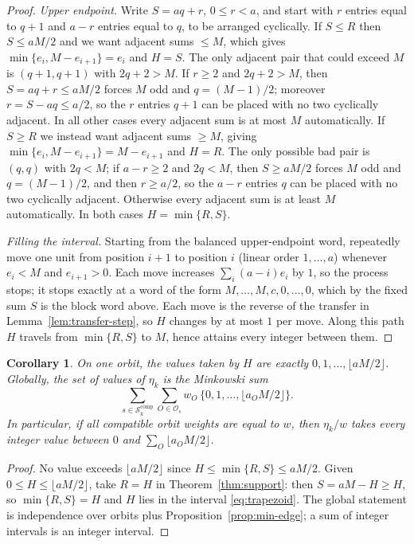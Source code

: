\documentclass[11pt,a4paper]{article}
\newcommand{\Os}{\mathcal O_s}
\numberwithin{equation}{section}
\theoremstyle{plain}
\newtheorem{corollary}[theorem]{Corollary}
\theoremstyle{definition}
\theoremstyle{remark}
\begin{document}
\begin{proof}
\emph{Upper endpoint.}  Write $S=aq+r$, $0\leq r<a$, and start with $r$ entries
equal to $q+1$ and $a-r$ entries equal to $q$, to be arranged cyclically.  If
$S\leq R$ then $S\leq aM/2$ and we want adjacent sums $\leq M$, which gives
$\min\{e_i,M-e_{i+1}\}=e_i$ and $H=S$.  The only adjacent pair that could exceed
$M$ is $(q+1,q+1)$ with $2q+2>M$.  If $r\geq2$ and $2q+2>M$, then
$S=aq+r\leq aM/2$ forces $M$ odd and $q=(M-1)/2$; moreover $r=S-aq\leq a/2$,
so the $r$ entries $q+1$ can be placed with no two cyclically adjacent.  In
all other cases every adjacent sum is at most $M$ automatically.  If
$S\geq R$ we instead want adjacent sums $\geq M$, giving
$\min\{e_i,M-e_{i+1}\}=M-e_{i+1}$ and $H=R$.  The only possible bad pair is
$(q,q)$ with $2q<M$; if $a-r\geq2$ and $2q<M$, then $S\geq aM/2$ forces $M$
odd and $q=(M-1)/2$, and then $r\geq a/2$, so the $a-r$ entries $q$ can be
placed with no two cyclically adjacent.  Otherwise every adjacent sum is at
least $M$ automatically.  In both
cases $H=\min\{R,S\}$.

\emph{Filling the interval.}  Starting from the balanced upper-endpoint word,
repeatedly move one unit from position $i+1$ to position $i$ (linear order
$1,\ldots,a$) whenever $e_i<M$ and $e_{i+1}>0$.  Each move increases
$\sum_i(a-i)e_i$ by $1$, so the process stops; it stops exactly at a word of
the form $M,\ldots,M,c,0,\ldots,0$, which by the fixed sum $S$ is the block
word above.  Each move is the reverse of the transfer in
Lemma~\ref{lem:transfer-step}, so $H$ changes by at most $1$ per move.  Along
this path $H$ travels from $\min\{R,S\}$ to $M$, hence attains every integer
between them.
\end{proof}


\begin{corollary}\label{cor:hull-values}
On one orbit, the values taken by $H$ are exactly
$0,1,\ldots,\lfloor aM/2\rfloor$.  Globally, the set of values of $\eta_k$ is
the Minkowski sum
\[
\sum_{s\in\mathcal{S}_k^{\mathrm{comp}}}\sum_{O\in\Os}
 w_O\,\{0,1,\ldots,\lfloor a_OM/2\rfloor\}.
\]
In particular, if all compatible orbit weights are equal to $w$, then
$\eta_k/w$ takes every integer value between $0$ and
$\sum_O\lfloor a_OM/2\rfloor$.
\end{corollary}

\begin{proof}
No value exceeds $\lfloor aM/2\rfloor$ since
$H\leq\min\{R,S\}\leq aM/2$.  Given $0\leq H\leq\lfloor aM/2\rfloor$, take
$R=H$ in Theorem~\ref{thm:support}: then $S=aM-H\geq H$, so
$\min\{R,S\}=H$ and $H$ lies in the interval \eqref{eq:trapezoid}.  The global
statement is independence over orbits plus Proposition~\ref{prop:min-edge};
a sum of integer intervals is an integer interval.
\end{proof}
\end{document}
